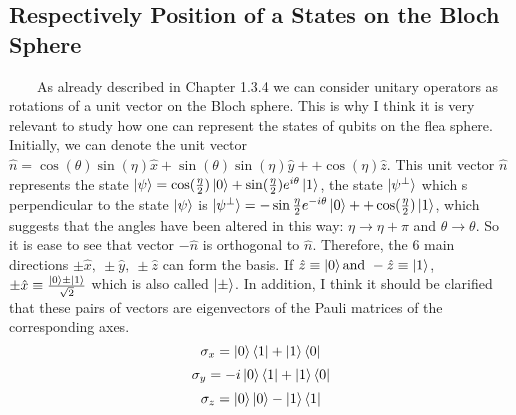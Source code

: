\documentclass[english,14pt,a4paper]{article}
\begin{document}
	
	 
	\subsection{Respectively Position of a States on the Bloch Sphere}\ \ \ \
	As already described in Chapter 1.3.4 we can consider unitary operators as rotations of a unit vector on the Bloch sphere. This is why I think it is very relevant to study how one can represent the states of qubits on the flea sphere. \\
	
	Initially, we can denote the unit vector $\hat{n} = \cos(\theta)\sin(\eta) \hat{x} + \sin(\theta)\sin(\eta)\hat{y} + +\cos(\eta)\hat{z}$. This unit vector $\hat{n}$ represents the state $\ket{\psi} = \cos(\frac{\eta }{2})\ket{0} + \sin(\frac{\eta}{2}) e^{i\theta}\ket{1}$, the state $\ket{\psi^{\perp}}$ which s perpendicular to the state $\ket{\psi}$ is $\ket{\psi^{\perp}} = -\sin{\frac{\eta}{2}}e^{-i\theta} \ket{0} ++ \cos(\frac{\eta}{2})\ket{1}$, which suggests that the angles have been altered in this way: $ \eta \rightarrow \eta + \pi $ and $ \theta \rightarrow \theta$. So it is ease to see that vector $-\hat{n}$ is orthogonal to $\hat{n}$. Therefore, the 6 main directions $\pm \hat{x}, \ \pm \hat{y}, \ \pm \hat{z}$ can form the basis. If $\hat{z} \equiv \ket{0} \text{and} \ -\hat{z} \equiv \ket{1}$, $\pm \hat{x} \equiv \frac{\ket{0} \pm \ket{1}}{\sqrt{2}}$ which is also called $\ket{\pm}$. In addition, I think it should be clarified that these pairs of vectors are eigenvectors of the Pauli matrices of the corresponding axes. 
	\[
	\sigma_x = \ket{0}\bra{1} + \ket{1}\bra{0}
	\]
	\[
	\sigma_y = -i\ket{0}\bra{1} + \ket{1}\bra{0}
	\]
	\[
	\sigma_z = \ket{0}\ket{0} - \ket{1}\bra{1}
	\]
	
\end{document}

